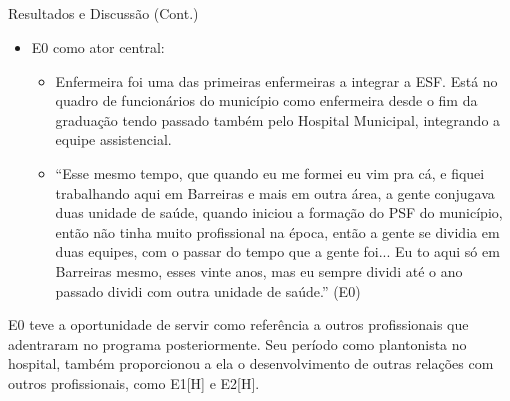 \documentclass[10pt]{beamer}
\begin{document}
\subsection{}
\begin{frame}{Resultados e Discussão (Cont.)}{}
  \begin{itemize}
    \item E0 como ator central:
    \begin{itemize}
    	\item Enfermeira foi uma das primeiras enfermeiras a integrar a ESF. Está no quadro de funcionários do município como enfermeira desde o fim da graduação tendo passado também pelo Hospital Municipal, integrando a equipe assistencial.
	\item ``Esse mesmo tempo, que quando eu me formei eu vim pra cá, e fiquei trabalhando aqui em Barreiras e mais em outra área, a gente conjugava duas unidade de saúde, quando iniciou a formação do PSF do município, então não tinha muito profissional na época, então a gente se dividia em duas equipes, com o passar do tempo que a gente foi... Eu to aqui só em Barreiras mesmo, esses vinte anos, mas eu sempre dividi até o ano passado dividi com outra unidade de saúde.'' (E0)
    \end{itemize}
  \end{itemize}
E0 teve a oportunidade de servir como referência a outros profissionais que adentraram no programa posteriormente. Seu período como plantonista no hospital, também proporcionou a ela o desenvolvimento de outras relações com outros profissionais, como E1[H] e E2[H].
\end{frame}

\section{}
\end{document}
